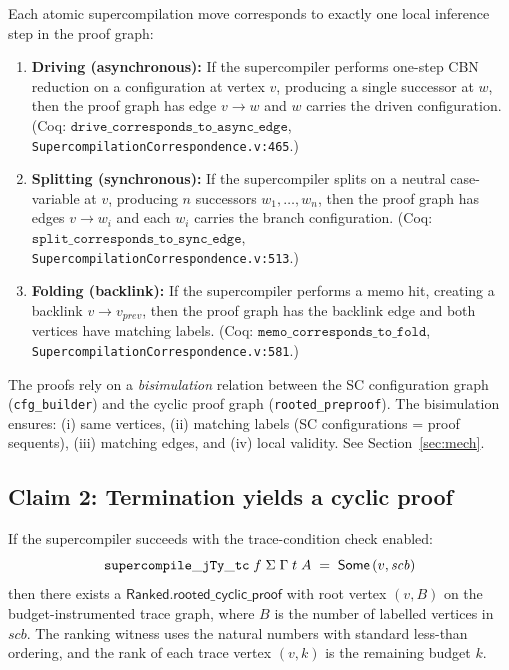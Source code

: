 \begin{theorem}
\label{thm:step-correspondence}
Each atomic supercompilation move corresponds to exactly one local inference step in the proof graph:
\begin{enumerate}
\item \textbf{Driving (asynchronous):} If the supercompiler performs one-step CBN reduction on a configuration at vertex $v$, producing a single successor at $w$, then the proof graph has edge $v \to w$ and $w$ carries the driven configuration. (Coq: $\texttt{drive\_corresponds\_to\_async\_edge}$, \texttt{SupercompilationCorrespondence.v:465}.)
\item \textbf{Splitting (synchronous):} If the supercompiler splits on a neutral case-variable at $v$, producing $n$ successors $w_1,\ldots,w_n$, then the proof graph has edges $v \to w_i$ and each $w_i$ carries the branch configuration. (Coq: $\texttt{split\_corresponds\_to\_sync\_edge}$, \texttt{SupercompilationCorrespondence.v:513}.)
\item \textbf{Folding (backlink):} If the supercompiler performs a memo hit, creating a backlink $v \to v_{\mathit{prev}}$, then the proof graph has the backlink edge and both vertices have matching labels. (Coq: $\texttt{memo\_corresponds\_to\_fold}$, \texttt{SupercompilationCorrespondence.v:581}.)
\end{enumerate}
\end{theorem}

\begin{remark}
The proofs rely on a \emph{bisimulation} relation between the SC configuration graph (\texttt{cfg\_builder}) and the cyclic proof graph (\texttt{rooted\_preproof}). The bisimulation ensures: (i) same vertices, (ii) matching labels (SC configurations = proof sequents), (iii) matching edges, and (iv) local validity. See Section~\ref{sec:mech}.
\end{remark}

\subsection{Claim 2: Termination yields a cyclic proof}

\begin{theorem}
\label{thm:cyclic-proof}
If the supercompiler succeeds with the trace-condition check enabled:
\[
\mathtt{supercompile\_jTy\_tc}\;f\;\Sigma\;\Gamma\;t\;A \;=\; \mathsf{Some}\,(v, \mathit{scb})
\]
then there exists a $\mathsf{Ranked.rooted\_cyclic\_proof}$ with root vertex $(v, B)$ on the budget-instrumented trace graph, where $B$ is the number of labelled vertices in $\mathit{scb}$.
The ranking witness uses the natural numbers with standard less-than ordering, and the rank of each trace vertex $(v,k)$ is the remaining budget $k$.
\end{theorem}


